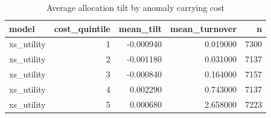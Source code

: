\begin{table}
\caption{Average allocation tilt by anomaly carrying cost}
\label{tab:t8_tilt_by_cost}
\begin{tabular}{lrrrr}
\toprule
model & cost\_quintile & mean\_tilt & mean\_turnover & n \\
\midrule
xs\_utility & 1 & -0.000940 & 0.019000 & 7300 \\
xs\_utility & 2 & -0.001180 & 0.031000 & 7137 \\
xs\_utility & 3 & -0.000840 & 0.164000 & 7157 \\
xs\_utility & 4 & 0.002290 & 0.743000 & 7137 \\
xs\_utility & 5 & 0.000680 & 2.658000 & 7223 \\
\bottomrule
\end{tabular}
\end{table}
